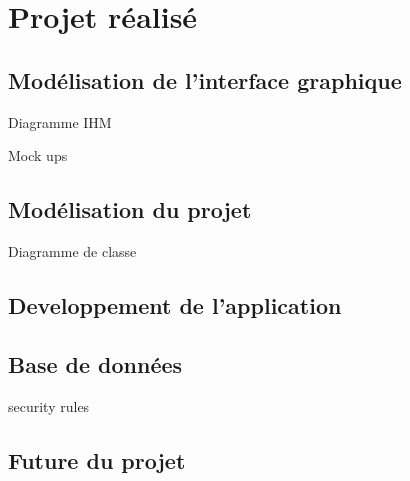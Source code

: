 \chapter{Projet réalisé}












\section{Modélisation de l'interface graphique}
Diagramme IHM

Mock ups

\section{Modélisation du projet}
Diagramme de classe

\section{Developpement de l'application}


\section{Base de données}
security rules




\section{Future du projet}
